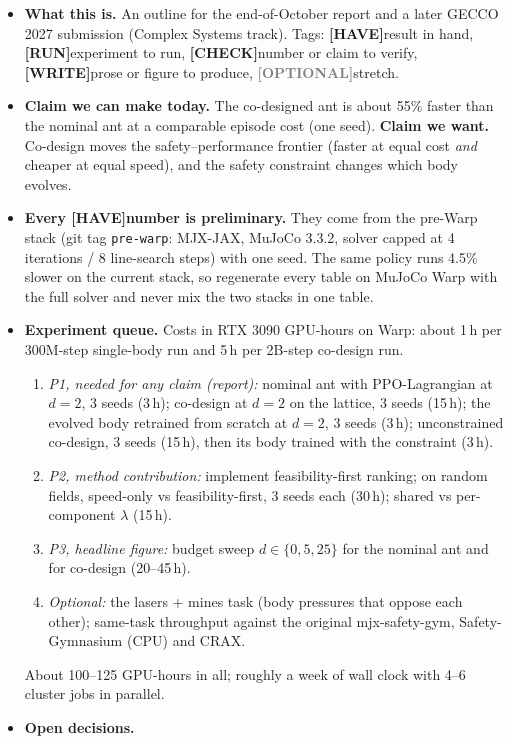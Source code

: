 \documentclass[sigconf,review]{acmart}
\newcommand{\statustag}[2]{\textcolor{#1}{\textsf{\scriptsize\bfseries[#2]}}}
\newcommand{\HAVE}{\statustag{teal!70!black}{HAVE}\hspace{0.3em}}
\newcommand{\RUN}{\statustag{red!75!black}{RUN}\hspace{0.3em}}
\newcommand{\CHECK}{\statustag{orange!85!black}{CHECK}\hspace{0.3em}}
\newcommand{\WRITE}{\statustag{blue!70!black}{WRITE}\hspace{0.3em}}
\newcommand{\OPT}{\statustag{gray}{OPTIONAL}\hspace{0.3em}}
\begin{document}
\begin{itemize}
\item \textbf{What this is.} An outline for the end-of-October report and a later GECCO 2027 submission (Complex Systems track). Tags: \HAVE result in hand, \RUN experiment to run, \CHECK number or claim to verify, \WRITE prose or figure to produce, \OPT stretch.
\item \textbf{Claim we can make today.} The co-designed ant is about 55\% faster than the nominal ant at a comparable episode cost (one seed). \textbf{Claim we want.} Co-design moves the safety--performance frontier (faster at equal cost \emph{and} cheaper at equal speed), and the safety constraint changes which body evolves.
\item \textbf{Every \HAVE number is preliminary.} They come from the pre-Warp stack (git tag \texttt{pre-warp}: MJX-JAX, MuJoCo 3.3.2, solver capped at 4 iterations / 8 line-search steps) with one seed. The same policy runs 4.5\% slower on the current stack, so regenerate every table on MuJoCo Warp with the full solver and never mix the two stacks in one table.
\item \textbf{Experiment queue.} Costs in RTX 3090 GPU-hours on Warp: about 1\,h per 300M-step single-body run and 5\,h per 2B-step co-design run.
  \begin{enumerate}
  \item \emph{P1, needed for any claim (report):} nominal ant with PPO-Lagrangian at $d=2$, 3 seeds (3\,h); co-design at $d=2$ on the lattice, 3 seeds (15\,h); the evolved body retrained from scratch at $d=2$, 3 seeds (3\,h); unconstrained co-design, 3 seeds (15\,h), then its body trained with the constraint (3\,h).
  \item \emph{P2, method contribution:} implement feasibility-first ranking; on random fields, speed-only vs feasibility-first, 3 seeds each (30\,h); shared vs per-component $\lambda$ (15\,h).
  \item \emph{P3, headline figure:} budget sweep $d \in \{0, 5, 25\}$ for the nominal ant and for co-design (20--45\,h).
  \item \emph{Optional:} the lasers + mines task (body pressures that oppose each other); same-task throughput against the original mjx-safety-gym, Safety-Gymnasium (CPU) and CRAX.
  \end{enumerate}
  About 100--125 GPU-hours in all; roughly a week of wall clock with 4--6 cluster jobs in parallel.
\item \textbf{Open decisions.}
  \begin{enumerate}

\end{enumerate}
\end{itemize}
\end{document}
